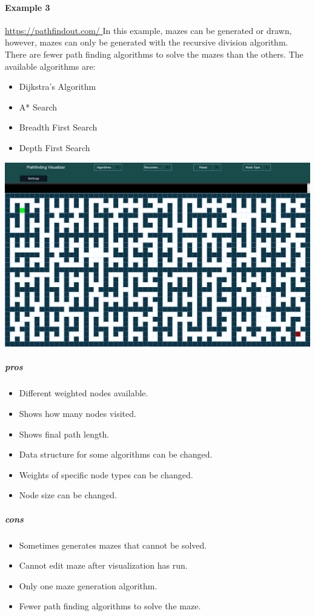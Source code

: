 \documentclass[titlepage]{article}
\begin{document}
\paragraph{Example 3}
\href{https://pathfindout.com/
}{https://pathfindout.com/
}
\newline
In this example, mazes can be generated or drawn, however, mazes can only be generated with the recursive division algorithm. There are fewer path finding algorithms to solve the mazes than the others. The available algorithms are:
\begin{itemize}
    \item Dijkstra's Algorithm
    \item A* Search
    \item Breadth First Search
    \item Depth First Search
\end{itemize}
\includegraphics[width=\linewidth]{assets/Existing Solutions/example 3.PNG}
\subparagraph*{pros}
\begin{itemize}
    \item Different weighted nodes available.
    \item Shows how many nodes visited.
    \item Shows final path length.
    \item Data structure for some algorithms can be changed.
    \item Weights of specific node types can be changed.
    \item Node size can be changed.
\end{itemize}
\subparagraph*{cons}
\begin{itemize}
    \item Sometimes generates mazes that cannot be solved.
    \item Cannot edit maze after visualization has run.
    \item Only one maze generation algorithm.
    \item Fewer path finding algorithms to solve the maze.
\end{itemize}
\end{document}
